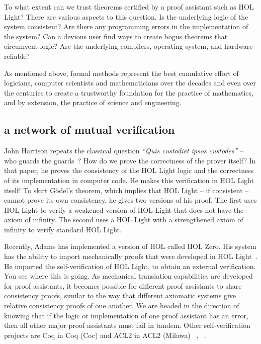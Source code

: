 \documentclass{llncs}
\begin{document}
To what extent can we trust theorems certified by a proof assistant
such as HOL Light?  There are  various aspects to this question.
Is the underlying logic of the system consistent?  Are there any
programming errors in the implementation of the system?  Can a devious
user find ways to create bogus theorems that circumvent logic?  Are
the underlying compilers, operating system, and hardware reliable?

As mentioned above, formal methods represent the best cumulative effort of
logicians, computer scientists and mathematicians over the decades and
even over the centuries to create a trustworthy foundation for the
practice of mathematics, and by extension, the practice of science and
engineering.  

\subsection{a network of mutual verification}

John Harrison repeats the classical question {\it ``Quis custodiet
  ipsos custodes''} -- who guards the guards~\cite{HaSelf}?  How do we
prove the correctness of the prover itself?  In that paper, he proves
the consistency of the HOL Light logic and the correctness of its
implementation in computer code.  He makes this verification in HOL
Light itself!  To skirt G\"odel's theorem, which implies that HOL
Light -- if consistent -- cannot prove its own consistency, he gives
two versions of his proof.  The first uses HOL Light to verify a
weakened version of HOL Light that does not have the axiom of
infinity.  The second uses a HOL Light with a strengthened axiom of
infinity to verify standard HOL Light.


Recently, Adams has implemented a version of HOL called HOL Zero.  His
system has the ability to import mechanically proofs that were
developed in HOL Light~\cite{Adams}.  He imported the
self-verification of HOL Light, to obtain an external verification.
You see where this is going.  As mechanical translation capabilities
are developed for proof assistants, it becomes possible for different
proof assistants to share consistency proofs, similar to the way that
different axiomatic systems give relative consistency proofs of one
another.  We are headed in the direction of knowing that if the logic
or implementation of one proof assistant has an error, then all other
major proof assistants must fail in tandem. Other self-verification
projects are Coq in Coq (Coc) and ACL2 in ACL2 (Milawa) ~\cite{Bar98},
~\cite{Dav09}.
\end{document}
